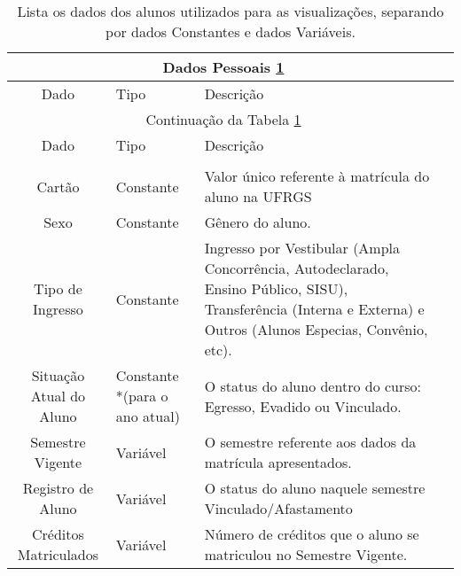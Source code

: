 \documentclass[cic,tc]{iiufrgs}
\begin{document}
\begin{longtable}[c]{|c|p{3cm}|p{4cm}|p{2cm}|}
    \caption{Lista os dados dos alunos utilizados para as visualizações, separando por dados Constantes e dados Variáveis. \label{tabDadosAlunos}}\\

    \hline
    \multicolumn{3}{|c|}{Dados Pessoais \ref{tabDadosAlunos}}\\
    \hline
    Dado & Tipo & Descrição\\
    \hline
    \endfirsthead
    
    \hline
    \multicolumn{3}{|c|}{Continuação da Tabela \ref{tabDadosAlunos}}\\
    \hline
    Dado & Tipo & Descrição\\
    \hline
    \endhead
    
    \hline
    \endfoot
    
    \hline
    \multicolumn{3}{| c |}{Fim da Tabela \ref{tabDadosAlunos}}\\
    \hline\hline
    \endlastfoot
    
        Cartão &   
        Constante & 
        Valor único referente à matrícula do aluno na UFRGS \\ \hline 
        
        Sexo &   
        Constante & 
        Gênero do aluno.  \\ \hline
        
        Tipo de Ingresso&
        Constante &
        Ingresso por Vestibular (Ampla Concorrência, Autodeclarado, Ensino Público, SISU), Transferência (Interna e Externa) e Outros (Alunos Especias, Convênio, etc). \\ \hline  
        
        Situação Atual do Aluno &
        Constante *(para o ano atual) &
        O status do aluno dentro do curso: Egresso, Evadido ou Vinculado.\\ \hline 
        
        Semestre Vigente &
        Variável &
        O semestre referente aos dados da matrícula apresentados. \\ \hline
        
        Registro de Aluno &
        Variável &
        O status do aluno naquele semestre Vinculado/Afastamento \\ \hline
        
        Créditos Matriculados &
        Variável &
        Número de créditos que o aluno se matriculou no Semestre Vigente. \\ \hline
        

\end{longtable}
\end{document}
